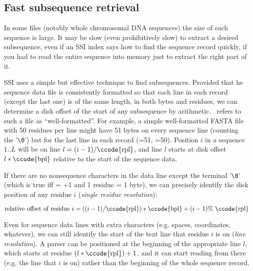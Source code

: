 \subsection{Fast subsequence retrieval}

In some files (notably whole chromosomal DNA sequences) the size of
each sequence is large. It may be slow (even prohibitively slow) to
extract a desired subsequence, even if an SSI index says how to find
the sequence record quickly, if you had to read the entire sequence
into memory just to extract the right part of it.

SSI uses a simple but effective technique to find subsequences.
Provided that he sequence data file is consistently formatted so that
each line in each record (except the last one) is of the same length,
in both bytes and residues, we can determine a disk offset of the
start of any subsequence by arithmetic. \Easel\ refers to such a file
as ``well-formatted''. For example, a simple well-formatted FASTA file
with 50 residues per line might have 51 bytes on every sequence line
(counting the '\verb+\0+') but for the last line in each record
(=51, =50). Position $i$ in a sequence $1..L$
will be on line $l = (i-1)/\mbox{\ccode{rpl}}$, and line $l$ starts at
disk offset $l * \mbox{\ccode{bpl}}$ relative to the start of the
sequence data.

If there are no nonsequence characters in the data line except the
terminal '\verb+\0+' (which is true iff  = +1
and 1 residue = 1 byte), we can precisely identify the disk position
of any residue $i$ (\emph{single residue resolution}):

\[
\mbox{relative offset of residue $i$} =
\left((i-1)/\mbox{\ccode{rpl}}\right)*\mbox{\ccode{bpl}} + (i-1) \% \mbox{ \ccode{rpl}}
\]

Even for sequence data lines with extra characters (e.g. spaces,
coordinates, whatever), we can still identify the start of the text
line that residue $i$ is on (\emph{line resolution}).  A parser can be
positioned at the beginning of the appropriate line $l$, which starts
at residue $(l*\mbox{\ccode{rpl}}) + 1$, and it can start reading from
there (e.g. the line that $i$ is on) rather than the beginning of the
whole sequence record.

